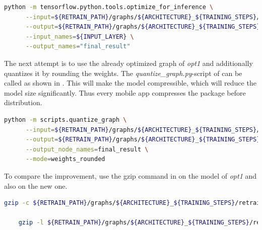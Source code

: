 \begin{minipage}{\linewidth}
\begin{lstlisting}[caption=Call of \textit{optimize_for_inference.py}, label=list:optimize_graph, language=bash]
	python -m tensorflow.python.tools.optimize_for_inference \
	  --input=${RETRAIN_PATH}/graphs/${ARCHITECTURE}_${TRAINING_STEPS}/retrained_dog_graph_${ARCHITECTURE}_${TRAINING_STEPS}_${LEARNING_RATE}.pb \
	  --output=${RETRAIN_PATH}/graphs/${ARCHITECTURE}_${TRAINING_STEPS}/opt1_retrained_dog_graph_${ARCHITECTURE}_${TRAINING_STEPS}_${LEARNING_RATE}.pb \
	  --input_names=${INPUT_LAYER} \
	  --output_names="final_result"
\end{lstlisting}
\end{minipage}

The next attempt is to use the already optimized graph of \textit{opt1} and additionally quantizes it by rounding the weights. The \textit{quantize_graph.py}-script of \citep{TensorflowDemo} can be called as shown in . This will make the model compressible, which will reduce the model size significantly. Thus every mobile app compresses the package before distribution.

\begin{minipage}{\linewidth}
\begin{lstlisting}[caption=Call of \textit{quantize_graph.py}, label=list:quantize_graph, language=bash]
	python -m scripts.quantize_graph \
	  --input=${RETRAIN_PATH}/graphs/${ARCHITECTURE}_${TRAINING_STEPS}/opt1_retrained_dog_graph_${ARCHITECTURE}_${TRAINING_STEPS}_${LEARNING_RATE}.pb \
	  --output=${RETRAIN_PATH}/graphs/${ARCHITECTURE}_${TRAINING_STEPS}/opt2_retrained_dog_graph_${ARCHITECTURE}_${TRAINING_STEPS}_${LEARNING_RATE}.pb \
	  --output_node_names=final_result \
	  --mode=weights_rounded
\end{lstlisting}
\end{minipage}

To compare the improvement, use the gzip command in  on the model of \textit{opt1} and also on the new one. 

\begin{minipage}{\linewidth}
\begin{lstlisting}[caption=Call of gzip, label=list:gzip, language=bash]
	gzip -c ${RETRAIN_PATH}/graphs/${ARCHITECTURE}_${TRAINING_STEPS}/retrained_dog_graph_${ARCHITECTURE}_${TRAINING_STEPS}_${LEARNING_RATE}.pb > ${RETRAIN_PATH}/graphs/${ARCHITECTURE}_${TRAINING_STEPS}/retrained_dog_graph_${ARCHITECTURE}_${TRAINING_STEPS}_${LEARNING_RATE}.pb.gz

	gzip -l ${RETRAIN_PATH}/graphs/${ARCHITECTURE}_${TRAINING_STEPS}/retrained_dog_graph_${ARCHITECTURE}_${TRAINING_STEPS}_${LEARNING_RATE}.pb.gz
\end{lstlisting}
\end{minipage}

